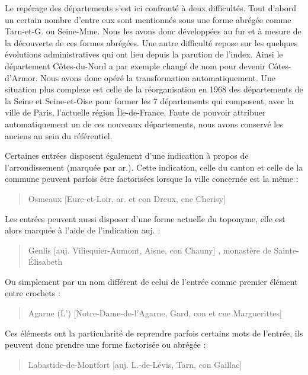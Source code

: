 \documentclass[a4paper,12pt,twoside]{book}
\begin{document}
	Le repérage des départements s'est ici confronté à deux difficultés. Tout d'abord un certain nombre d'entre eux sont mentionnés sous une forme abrégée comme \og Tarn-et-G.\fg{} ou \og Seine-Mme\fg{}. Nous les avons donc développées au fur et à mesure de la découverte de ces formes abrégées. Une autre difficulté repose sur les quelques évolutions administratives qui ont lieu depuis la parution de l'index. Ainsi le département \og Côtes-du-Nord\fg{} a par exemple changé de nom pour devenir \og Côtes-d'Armor\fg{}. Nous avons donc opéré la transformation automatiquement. Une situation plus complexe est celle de la réorganisation en 1968 des départements de la \og Seine\fg{} et \og Seine-et-Oise\fg{} pour former les 7 départements qui composent, avec la ville de Paris, l'actuelle région Île-de-France. Faute de pouvoir attribuer automatiquement un de ces nouveaux départements, nous avons conservé les anciens au sein du référentiel.
	
	Certaines entrées disposent également d'une indication à propos de l'arrondissement (marquée par \og ar.\fg{}). Cette indication, celle du canton et celle de la commune peuvent parfois être factorisées lorsque la ville concernée est la même :
	
	\begin{quotation}
		Osmeaux [Eure-et-Loir, ar. et con Dreux, cne Cherisy]
	\end{quotation}
	
	 Les entrées peuvent aussi disposer d'une forme actuelle du toponyme, elle est alors marquée à l'aide de l'indication \og auj.\fg{} :
	
	\begin{quotation}
		Genlis [auj. Viliequier-Aumont, Aisne, con Chauny] , monastère
		de Sainte-Élisabeth
	\end{quotation}

	\noindent Ou simplement par un nom différent de celui de l'entrée comme premier élément entre crochets :
	
	\begin{quotation}
		Agarne (L') [Notre-Dame-de-l'Agarne, Gard, con et cne Marguerittes]
	\end{quotation}
	
	\noindent Ces éléments ont la particularité de reprendre parfois certains mots de l'entrée, ils peuvent donc prendre une forme factorisée ou abrégée :
	
	\begin{quotation}
		Labastide-de-Montfort [auj. L.-de-Lévis, Tarn, con Gaillac]
	\end{quotation}
	
\end{document}
